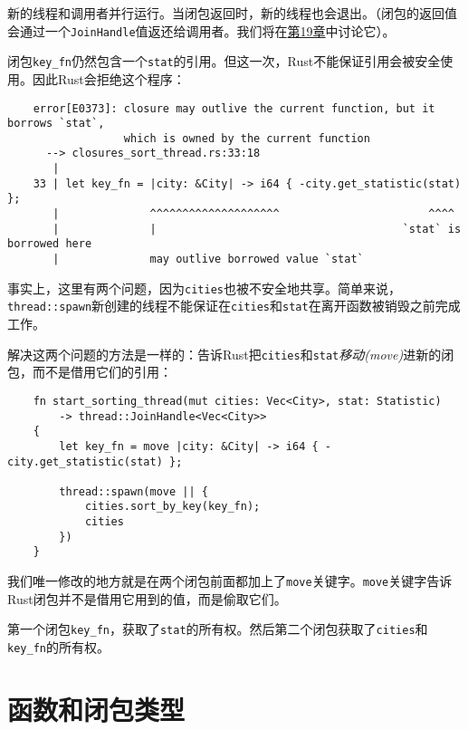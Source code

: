 新的线程和调用者并行运行。当闭包返回时，新的线程也会退出。（闭包的返回值会通过一个\texttt{JoinHandle}值返还给调用者。我们将在\hyperref[ch19]{第19章}中讨论它）。

闭包\texttt{key\_fn}仍然包含一个\texttt{stat}的引用。但这一次，Rust不能保证引用会被安全使用。因此Rust会拒绝这个程序：
\begin{verbatim}
    error[E0373]: closure may outlive the current function, but it borrows `stat`,
                  which is owned by the current function
      --> closures_sort_thread.rs:33:18
       |
    33 | let key_fn = |city: &City| -> i64 { -city.get_statistic(stat) };
       |              ^^^^^^^^^^^^^^^^^^^^                       ^^^^
       |              |                                      `stat` is borrowed here
       |              may outlive borrowed value `stat`
\end{verbatim}

事实上，这里有两个问题，因为\texttt{cities}也被不安全地共享。简单来说，\texttt{thread::spawn}新创建的线程不能保证在\texttt{cities}和\texttt{stat}在离开函数被销毁之前完成工作。

解决这两个问题的方法是一样的：告诉Rust把\texttt{cities}和\texttt{stat}\emph{移动(move)}进新的闭包，而不是借用它们的引用：
\begin{verbatim}
    fn start_sorting_thread(mut cities: Vec<City>, stat: Statistic)
        -> thread::JoinHandle<Vec<City>>
    {
        let key_fn = move |city: &City| -> i64 { -city.get_statistic(stat) };

        thread::spawn(move || {
            cities.sort_by_key(key_fn);
            cities
        })
    }
\end{verbatim}

我们唯一修改的地方就是在两个闭包前面都加上了\texttt{move}关键字。\texttt{move}关键字告诉Rust闭包并不是借用它用到的值，而是偷取它们。

第一个闭包\texttt{key\_fn}，获取了\texttt{stat}的所有权。然后第二个闭包获取了\texttt{cities}和\texttt{key\_fn}的所有权。



\section{函数和闭包类型}\label{fn}
